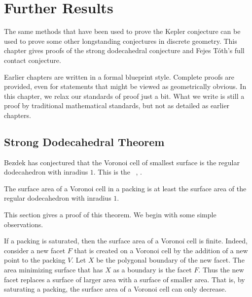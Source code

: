 
\chapter{Further Results}\label{sec:further}


The same methods that have been used to prove the Kepler conjecture
can be used to prove some other longstanding conjectures in discrete
geometry.  This chapter gives proofs of the strong dodecahedral
conjecture and Fejes T\'oth's full contact conjecture.

Earlier chapters are written in a formal blueprint style.
Complete proofs are provided, even for statements that might be
viewed as geometrically obvious.  In this chapter, we relax our
standards of proof just a bit.  What we write is still a proof by
traditional mathematical standards, but not as detailed as earlier
chapters.

\section{Strong Dodecahedral Theorem}

Bezdek has conjectured that the Voronoi cell of smallest surface is
the regular dodecahedron with inradius $1$.  This is the
~\cite{Bezdek00}, \cite{Bezdek05}.  
%
%
%


\begin{theorem}
  The surface area of a Voronoi cell in a packing is at least the
  surface area of the regular dodecahedron with inradius $1$.
\end{theorem}
%


This section gives a proof of this theorem.  We
begin with some simple observations.

\begin{remark}
  If a packing is  saturated, then the surface area of a Voronoi
  cell is finite.  
  Indeed, consider a new facet $F$ that is created on a Voronoi cell
  by the addition of a new point to the packing $V$.  Let $X$ be the
  polygonal boundary of the new facet.  The area minimizing surface
  that has $X$ as a boundary is the facet $F$.  Thus the new facet
  replaces a surface of larger area with a surface of smaller area.
  That is, by saturating a packing, the surface area of a Voronoi cell
  can only decrease.
\end{remark}

